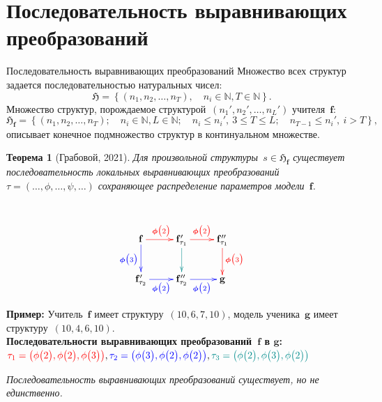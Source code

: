 \documentclass[10pt,pdf,hyperref={unicode}]{beamer}
\newtheorem{rustheorem}{Теорема}
\begin{document}

\section{Последовательность выравнивающих преобразований}
\begin{frame}{Последовательность выравнивающих преобразований}
\justifying
Множество всех структур задается последовательностью натуральных чисел:
\[
\mathfrak{H} = \left\{(n_1, n_2, \ldots, n_{T}), \quad n_i \in \mathbb{N}, T \in \mathbb{N}\right\}.
\]
Множество структур, порождаемое структурой~$(n_{1}', n_{2}', \ldots, n_{L}')$ учителя~$\mathbf{f}$:
\[
\mathfrak{H}_{\mathbf{f}} = \left\{\left(n_1, n_2, \ldots, n_{T}\right); \quad n_i \in \mathbb{N}, L \in \mathbb{N}; \quad n_i \leq n_{i}',~3\leq T\leq L; \quad n_{T-1} \leq n_{i}',~i > T\right\},
\]
описывает конечное подмножество структур в континуальном множестве.

\begin{minipage}[t]{.65\textwidth}

\begin{rustheorem}[Грабовой, 2021]
\justifying
Для произвольной структуры~$s \in \mathfrak{H}_{\mathbf{f}}$ существует последовательность локальных выравнивающих преобразований $\tau = (\ldots, \phi, \ldots, \psi, \ldots)$ сохраняющее распределение параметров модели~$\mathbf{f}$.
\end{rustheorem}

\end{minipage}%
\begin{minipage}[t]{.34\textwidth}

~\\[-2mm]
\begin{equation*}
\xymatrix{
\mathbf{f}\ar@[blue][d]_{\color{blue}\bm{\phi}\bigr(3\bigr)}\ar@[red][r]^{\color{red}\bm{\phi}\bigr(2\bigr)}
& 
\mathbf{f}_{\tau_1}'\ar@[darkcyan][d]\ar@[red][r]^{\color{red}\bm{\phi}\bigr(2\bigr)}
&
\mathbf{f}_{\tau_1}''\ar@[red][d]^{\color{red}\bm{\phi}\bigr(3\bigr)}
\\
\mathbf{f}_{\tau_2}'\ar@[blue][r]_{\color{blue}\bm{\phi}\bigr(2\bigr)}
& 
\mathbf{f}_{\tau_2}''\ar@[blue][r]_{\color{blue}\bm{\phi}\bigr(2\bigr)}
&
\mathbf{g}
}
\end{equation*}

\end{minipage}

\textbf{Пример:} Учитель~$\mathbf{f}$ имеет структуру~$(10, 6, 7, 10)$, модель ученика~$\mathbf{g}$ имеет структуру~$(10,4,6,10)$.\\
\textbf{Последовательности выравнивающих преобразований~$\mathbf{f}$ в $\mathbf{g}$:}\\
${\color{red}\tau_1=\left(\phi\bigr(2\bigr), \phi\bigr(2\bigr), \phi\bigr(3\bigr)\right)}, {\color{blue}\tau_2=\left(\phi\bigr(3\bigr), \phi\bigr(2\bigr), \phi\bigr(2\bigr)\right)}, {\color{darkcyan}\tau_3=\left(\phi\bigr(2\bigr), \phi\bigr(3\bigr), \phi\bigr(2\bigr)\right)}$


{\it Последовательность выравнивающих преобразований существует, но не единственно.}
\end{frame}
\end{document}
